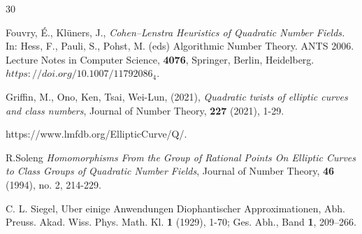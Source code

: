 \documentclass[12pt, 14paper]{amsart}
\theoremstyle{plain}
\numberwithin{equation}{section}
\begin{document}
\begin{thebibliography}{30}




    
   




   Fouvry, É., Klüners, J., \textit{Cohen–Lenstra Heuristics of Quadratic Number Fields.} In: Hess, F., Pauli, S., Pohst, M. (eds) Algorithmic Number Theory. ANTS 2006. Lecture Notes in Computer Science, \textbf{4076}, Springer, Berlin, Heidelberg. $https://doi.org/10.1007/11792086_4$.
  
   Griffin, M., Ono, Ken, Tsai, Wei-Lun, (2021), \textit{Quadratic twists of elliptic curves and class numbers}, Journal of Number Theory, \textbf{227} (2021),  1-29.

  

   https://www.lmfdb.org/EllipticCurve/Q/.

    R.Soleng \textit{ Homomorphisms From the Group of Rational Points On Elliptic Curves to Class Groups of Quadratic Number Fields}, Journal of Number Theory, \textbf{46} (1994), no. 2, 214-229. 

    C. L. Siegel, Uber einige Anwendungen Diophantischer Approximationen, Abh. Preuss. Akad.
Wiss. Phys. Math. Kl. \textbf{1} (1929), 1-70; Ges. Abh., Band \textbf{1}, 209–266.


\end{thebibliography}
\end{document}
